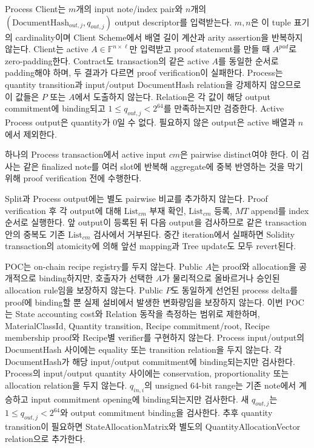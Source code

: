 \documentclass[11pt,a4paper]{extarticle}
\newcommand{\DocumentHash}{\mathrm{DocumentHash}}
\newcommand{\List}[1]{\mathrm{List}_{#1}}
\begin{document}
Process Client는 $m$개의 input note/index pair와 $n$개의
$(\DocumentHash_{out,j},q_{out,j})$ output descriptor를 입력받는다. $m,n$은 이 tuple 표기의
cardinality이며 Client Scheme에서 배열 길이 계산과 arity assertion을 반복하지 않는다.
Client는 active $A\in\mathbb{F}^{n\times\ell}$만 입력받고 proof statement를 만들 때
$A^{pad}$로 zero-padding한다. Contract도 transaction의 같은 active $A$를 동일한 순서로
padding해야 하며, 두 결과가 다르면 proof verification이 실패한다.
Process는 quantity transition과 input/output
DocumentHash relation을 강제하지 않으므로 이 값들은 $P$ 또는 $A$에서 도출하지 않는다.
Relation은 각 값이 해당 output commitment에 binding되고
$1\leq q_{out,j}<2^{64}$를 만족하는지만 검증한다. Active Process output은 quantity가
0일 수 없다. 필요하지 않은 output은 active 배열과 $n$에서 제외한다.

하나의 Process transaction에서 active input $cm$은 pairwise distinct여야 한다. 이 검사는
같은 finalized note를 여러 slot에 반복해 aggregate에 중복 반영하는 것을 막기 위해 proof
verification 전에 수행한다.

Split과 Process output에는 별도 pairwise 비교를 추가하지 않는다. Proof verification 후
각 output에 대해 $\List{cm}$ 부재 확인, $\List{cm}$ 등록, $MT$ append를 index 순서로
실행한다. 앞 output이 등록된 뒤 다음 output을 검사하므로 같은 transaction 안의 중복도
기존 $\List{cm}$ 검사에서 거부된다. 중간 iteration에서 실패하면 Solidity transaction의
atomicity에 의해 앞선 mapping과 Tree update도 모두 revert된다.

POC는 on-chain recipe registry를 두지 않는다. Public $A$는 proof와 allocation을
공개적으로 binding하지만, 호출자가 선택한 $A$가 물리적으로 올바르거나 승인된
allocation rule임을 보장하지 않는다.
Public $P$도 동일하게 선언된 process delta를 proof에 binding할 뿐 실제 설비에서 발생한
변화량임을 보장하지 않는다. 이번 POC는 State accounting cost와 Relation 동작을 측정하는
범위로 제한하며, MaterialClassId, Quantity transition, Recipe commitment/root,
Recipe membership proof와 Recipe별 verifier를 구현하지 않는다.
Process input/output의 DocumentHash 사이에는 equality 또는 transition relation을 두지
않는다. 각 DocumentHash가 해당 input/output commitment에 binding되는지만 검사한다.
Process의 input/output quantity 사이에는 conservation, proportionality 또는 allocation
relation을 두지 않는다. $q_{in,i}$의 unsigned 64-bit range는 기존 note에서 계승하고
input commitment opening에 binding되는지만 검사한다. 새 $q_{out,j}$는
$1\leq q_{out,j}<2^{64}$와 output commitment binding을 검사한다. 추후 quantity transition이 필요하면
StateAllocationMatrix와 별도의 QuantityAllocationVector relation으로 추가한다.
\end{document}
